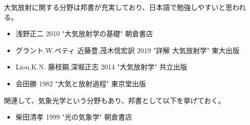 \documentclass{jsarticle}
\begin{document}
大気放射に関する分野は邦書が充実しており、日本語で勉強しやすいと思われる。
\begin{itemize}
\item 浅野正二 2010 "大気放射学の基礎" 朝倉書店
\item グラント.W.ペティ 近藤豊,茂木信宏訳 2019 "詳解 大気放射学" 東大出版
\item Liou.K.N. 藤枝鋼,深堀正志 2014 "大気放射学" 共立出版
\item 会田勝 1982 "大気と放射過程" 東京堂出版
\end{itemize}

関連して、気象光学という分野もあり、邦書として以下を挙げておく。
\begin{itemize}
\item 柴田清孝 1999 "光の気象学" 朝倉書店
\end{itemize}
\end{document}

